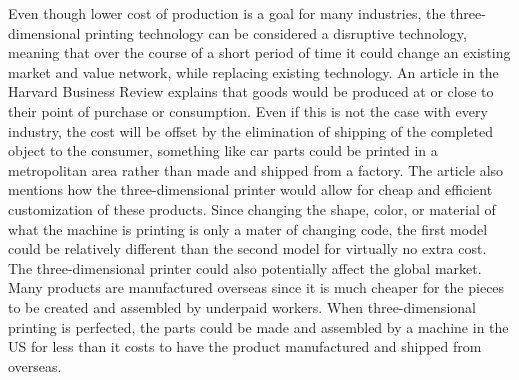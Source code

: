 \documentclass[pdftex,10.5pt]{report}
\begin{document}
 Even though lower cost of production is a goal for many industries, the three-dimensional printing technology can be considered a disruptive technology, meaning that over the course of a short period of time it could change an existing market and value network, while replacing existing technology. An article in the Harvard Business Review explains that goods would be produced at or close to their point of purchase or consumption. Even if this is not the case with every industry, the cost will be offset by the elimination of shipping of the completed object to the consumer, something like car parts could be printed in a metropolitan area rather than made and shipped from a factory. The article also mentions how the three-dimensional printer would allow for cheap and efficient customization of these products. Since changing the shape, color, or material of what the machine is printing is only a mater of changing code, the first model could be relatively different than the second model for virtually no extra cost. \cite{cite6} The three-dimensional printer could also potentially affect the global market. Many products are manufactured overseas since it is much cheaper for the pieces to be created and assembled by underpaid workers. When three-dimensional printing is perfected, the parts could be made and assembled by a machine in the US for less than it costs to have the product manufactured and shipped from overseas. 
\end{document}
